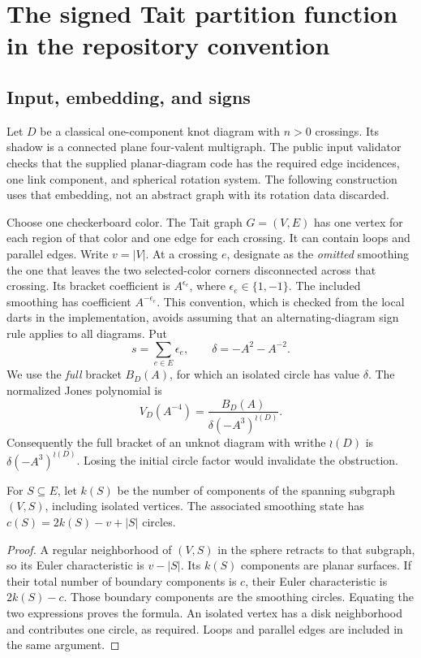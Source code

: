 \section{The signed Tait partition function in the repository convention}
\label{sec:potts}

\subsection{Input, embedding, and signs}

Let $D$ be a classical one-component knot diagram with $n>0$ crossings.
Its shadow is a connected plane four-valent multigraph. The public input
validator checks that the supplied planar-diagram code has the required
edge incidences, one link component, and spherical rotation system.
The following construction uses that embedding, not an abstract graph
with its rotation data discarded.

Choose one checkerboard color. The Tait graph $G=(V,E)$ has one vertex for
each region of that color and one edge for each crossing. It can contain
loops and parallel edges. Write $v=|V|$. At a crossing $e$, designate as the
\emph{omitted} smoothing the one that leaves the two selected-color
corners disconnected across that crossing. Its bracket coefficient is
$A^{\epsilon_e}$, where $\epsilon_e\in\{1,-1\}$.
The included smoothing has coefficient $A^{-\epsilon_e}$.
This convention, which is checked from the local darts in the implementation,
avoids assuming that an alternating-diagram sign rule applies to all
diagrams. Put
\[
 s=\sum_{e\in E}\epsilon_e,\qquad \delta=-A^2-A^{-2}.
\]
We use the \emph{full} bracket $B_D(A)$, for which an isolated circle has
value $\delta$. The normalized Jones polynomial is
\begin{equation}
 V_D(A^{-4})=\frac{B_D(A)}{\delta(-A^3)^{\wr(D)}}.
 \label{eq:jones-normalization}
\end{equation}
Consequently the full bracket of an unknot diagram with writhe $\wr(D)$ is
$\delta(-A^3)^{\wr(D)}$. Losing the initial circle factor would invalidate the
obstruction.

\begin{lemma}\label{lem:circles}
For $S\subseteq E$, let $k(S)$ be the number of components of the spanning
subgraph $(V,S)$, including isolated vertices. The associated smoothing state
has $c(S)=2k(S)-v+|S|$ circles.
\end{lemma}
\begin{proof}
A regular neighborhood of $(V,S)$ in the sphere retracts to that subgraph,
so its Euler characteristic is $v-|S|$. Its $k(S)$ components are planar
surfaces. If their total number of boundary components is $c$, their Euler
characteristic is $2k(S)-c$. Those boundary components are the smoothing
circles. Equating the two expressions proves the formula. An isolated vertex
has a disk neighborhood and contributes one circle, as required. Loops and
parallel edges are included in the same argument.
\end{proof}

